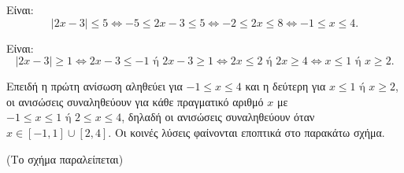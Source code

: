 
\begin{alist}
\item 
\begin{rlist}
\item Είναι:
\[|2x - 3| \le 5 \Leftrightarrow -5 \le 2x - 3 \le 5 \Leftrightarrow -2 \le 2x \le 8 \Leftrightarrow -1 \le x \le 4.\]

\item Είναι:
\[|2x - 3| \ge 1 \Leftrightarrow 2x - 3 \le -1 \text{ ή } 2x - 3 \ge 1 \Leftrightarrow 2x \le 2 \text{ ή } 2x \ge 4 \Leftrightarrow x \le 1 \text{ ή } x \ge 2.\]
\end{rlist}

\item Επειδή η πρώτη ανίσωση αληθεύει για $-1 \le x \le 4$ και η δεύτερη για $x \le 1 \text{ ή } x \ge 2$, οι
ανισώσεις συναληθεύουν για κάθε πραγματικό αριθμό $x$ με $-1 \le x \le 1 \text{ ή } 2 \le x \le 4$,
δηλαδή οι ανισώσεις συναληθεύουν όταν $x \in [-1, 1] \cup [2, 4]$. Οι κοινές λύσεις φαίνονται
εποπτικά στο παρακάτω σχήμα.

(Το σχήμα παραλείπεται)
\end{alist}

